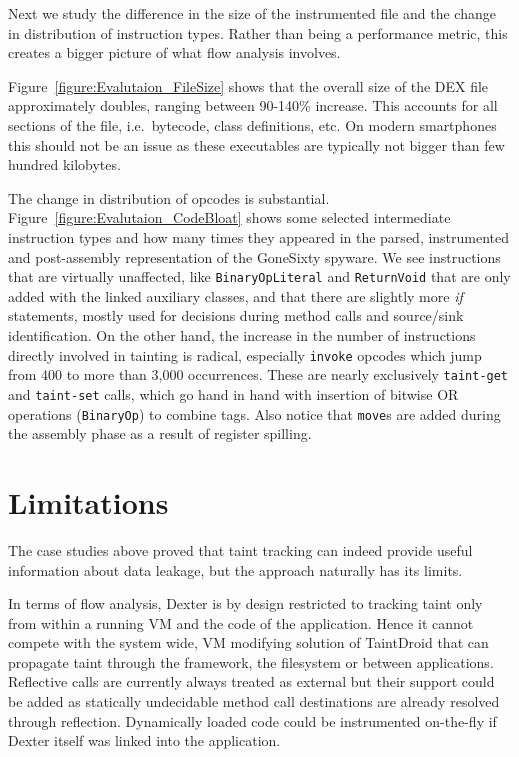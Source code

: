 \documentclass[12pt,twoside,notitlepage]{report}
\begin{document}
Next we study the difference in the size of the instrumented file and the change in distribution of instruction types. Rather than being a performance metric, this creates a bigger picture of what flow analysis involves.

Figure~\ref{figure:Evalutaion_FileSize} shows that the overall size of the DEX file approximately doubles, ranging between 90-140\% increase. This accounts for all sections of the file, i.e.\ bytecode, class definitions, etc. On modern smartphones this should not be an issue as these executables are typically not bigger than few hundred kilobytes.

\parbox{\textwidth}{
The change in distribution of opcodes is substantial. Figure~\ref{figure:Evalutaion_CodeBloat} shows some selected intermediate instruction types and how many times they appeared in the parsed, instrumented and post-assembly representation of the GoneSixty spyware. We see instructions that are virtually unaffected, like \texttt{BinaryOpLiteral} and \texttt{ReturnVoid} that are only added with the linked auxiliary classes, and that there are slightly more \emph{if} statements, mostly used for decisions during method calls and source/sink identification. On the other hand, the increase in the number of instructions directly involved in tainting is radical, especially \texttt{invoke} opcodes which jump from 400 to more than 3,000 occurrences. These are nearly exclusively \texttt{taint-get} and \texttt{taint-set} calls, which go hand in hand with insertion of bitwise OR operations (\texttt{BinaryOp}) to combine tags. Also notice that \texttt{move}s are added during the assembly phase as a result of register spilling.
}

\section{Limitations}

The case studies above proved that taint tracking can indeed provide useful information about data leakage, but the approach naturally has its limits. 

In terms of flow analysis, Dexter is by design restricted to tracking taint only from within a running VM and the code of the application. Hence it cannot compete with the system wide, VM modifying solution of TaintDroid that can propagate taint through the framework, the filesystem or between applications. Reflective calls are currently always treated as external but their support could be added as statically undecidable method call destinations are already resolved through reflection. Dynamically loaded code could be instrumented on-the-fly if Dexter itself was linked into the application.
\end{document}
